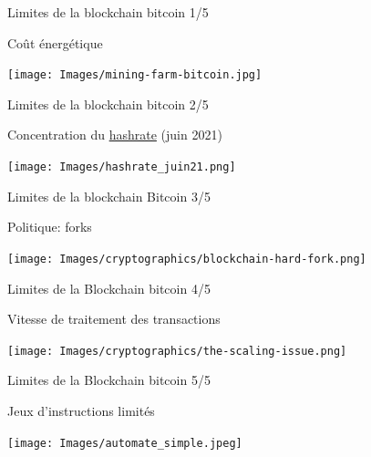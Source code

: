 \documentclass{beamer}
\begin{document}
\begin{frame}[label={sec:org48b1e57}]{Limites de la blockchain bitcoin 1/5}
  \begin{block}{Coût énergétique}
    \begin{center}
      \texttt{[image: Images/mining-farm-bitcoin.jpg]}
    \end{center}
  \end{block}
\end{frame}

\begin{frame}[label={sec:org0c58574}]{Limites de la blockchain bitcoin 2/5}
  \begin{block}{Concentration du \href{https://www.blockchain.com/charts/pools}{hashrate} (juin 2021)}
    \begin{center}
      \texttt{[image: Images/hashrate\_juin21.png]}
    \end{center}
  \end{block}
\end{frame}

\begin{frame}[label={sec:org5d6af00}]{Limites de la blockchain Bitcoin 3/5}
  \begin{block}{Politique: forks}
    \begin{center}
      \texttt{[image: Images/cryptographics/blockchain-hard-fork.png]}
    \end{center}
  \end{block}
\end{frame}

\begin{frame}[label={sec:orgdcb07cf}]{Limites de la Blockchain bitcoin 4/5}
  \begin{block}{Vitesse de traitement des transactions}
    \begin{center}
      \texttt{[image: Images/cryptographics/the-scaling-issue.png]}
    \end{center}
  \end{block}
\end{frame}

\begin{frame}[label={sec:org88e1887}]{Limites de la Blockchain bitcoin 5/5}
  \begin{block}{Jeux d'instructions limités}
    \begin{center}
      \texttt{[image: Images/automate\_simple.jpeg]}
    \end{center}
  \end{block}
\end{frame}
\end{document}
